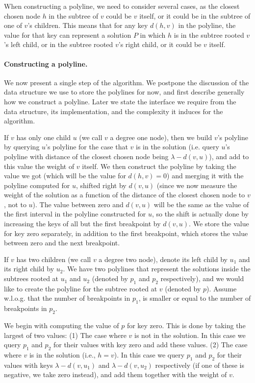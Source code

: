 \documentclass[11pt,a4paper]{article}
\theoremstyle{definition}
\theoremstyle{remark}
\begin{document}
When constructing a polyline, we need to consider several cases, as the closest chosen node $h$ in the subtree of $v$ could be $v$ itself, or it could be in the subtree of one of $v$'s children. This means that for any key $d(h,v)$ in the polyline, the value for that key can represent a solution $P$ in which $h$ is in the subtree rooted $v$'s left child, or in the subtree rooted $v$'s right child, or it could be $v$ itself.


\paragraph{Constructing a polyline.} We now present a single step of the algorithm. We postpone the discussion of the data structure we use to store the polylines for now, and first describe generally how we construct a polyline. Later we state the interface we require from the data structure, its implementation, and the complexity it induces for the algorithm.

If $v$ has only one child $u$ (we call $v$ a degree one node), then we build $v$'s polyline by querying $u$'s polyline for the case that $v$ is in the solution (i.e. query $u$'s polyline with distance of the closest chosen node being $\lambda-d(v,u)$), and add to this value the weight of $v$ itself. We then construct the polyline by taking the value we got (which will be the value for $d(h,v)=0$) and merging it with the polyline computed for $u$, shifted right by $d(v,u)$ (since we now measure the weight of the solution as a function of the distance of the closest chosen node to $v$, not to $u$). The value between zero and $d(v,u)$ will be the same as the value of the first interval in the polyline constructed for $u$, so the shift is actually done by increasing the keys of all but the first breakpoint by $d(v,u)$. We store the value for key zero separately, in addition to the first breakpoint, which stores the value between zero and the next breakpoint.

If $v$ has two children  (we call $v$ a degree two node), denote its left child by $u_1$ and its right child by $u_2$. We have two polylines that represent the solutions inside the subtrees rooted at $u_1$ and $u_2$ (denoted by $p_1$ and $p_2$ respectively), and we would like to create the polyline for the subtree rooted at $v$ (denoted by $p$).
Assume w.l.o.g. that the number of breakpoints in $p_1$, is smaller or equal to the number of breakpoints in $p_2$.

We begin with computing the value of $p$ for key zero. This is done by taking the largest of two values: (1) The case where $v$ is not in the solution. In this case we  query $p_1$ and $p_2$ for their values with key zero and add these values.
(2) The case where $v$ is in the solution (i.e., $h=v$). In this case we query $p_1$ and $p_2$ for their values with keys $\lambda - d(v,u_1)$ and $\lambda - d(v,u_2)$ respectively (if one of these is negative, we take zero instead), and add them together with the weight of $v$. 
\end{document}
